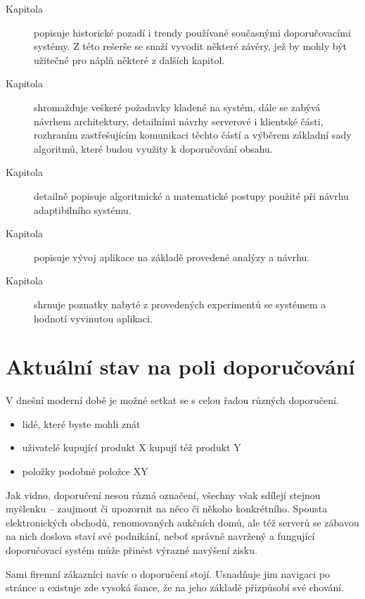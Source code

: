 \documentclass[thesis=M,czech]{FITthesis}[2014/05/07]
\begin{document}
\begin{introduction}
\begin{description}
  \item[Kapitola]  popisuje historické pozadí i trendy používané současnými doporučovacími systémy. Z této rešerše se snaží vyvodit některé závěry, jež by mohly být užitečné pro náplň některé z dalších kapitol.
  \item[Kapitola]  shromažďuje veškeré požadavky kladené na systém, dále se zabývá návrhem architektury, detailními návrhy serverové i klientské části, rozhraním zastřešujícím komunikaci těchto částí a výběrem základní sady algoritmů, které budou využity k doporučování obsahu. 
  \item[Kapitola]  detailně popisuje algoritmické a matematické postupy použité při návrhu adaptibilního systému. 
  \item[Kapitola]  popisuje vývoj aplikace na základě provedené analýzy a návrhu.
  \item[Kapitola]  shrnuje poznatky nabyté z provedených experimentů se systémem a hodnotí vyvinutou aplikaci. 
\end{description}
	
\end{introduction}
	
\chapter{Aktuální stav na poli doporučování}	
\label{chap:current}

V dnešní moderní době je možné setkat se s celou řadou různých doporučení.

\begin{itemize}
	\item lidé, které byste mohli znát
	\item uživatelé kupující produkt X kupují též produkt Y
	\item položky podobné položce XY	
\end{itemize}

Jak vidno, doporučení nesou různá označení, všechny však sdílejí stejnou myšlenku – zaujmout či upozornit na něco či někoho konkrétního. Spousta elektronických obchodů, renomovaných aukčních domů, ale též serverů se zábavou na nich doslova staví své podnikání, neboť správně navržený a fungující doporučovací systém může přinést výrazné navýšení zisku. 

Sami firemní zákazníci navíc o doporučení stojí. Usnadňuje jim navigaci po stránce a existuje zde vysoká šance, že na jeho základě přizpůsobí své chování.
\end{document}
